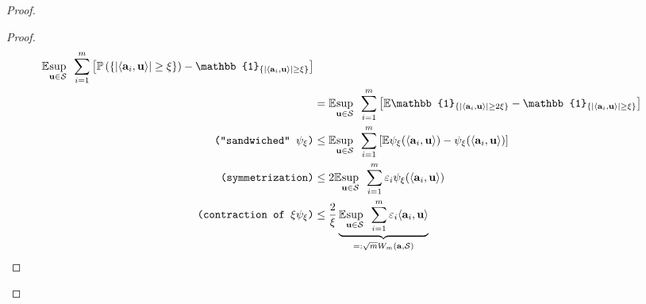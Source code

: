 \begin{proof}
\begin{proof}
{                \begin{align*}
                    \mathbb{E} \underset{\mathbf{u} \in \mathcal{S}}{\sup} \enspace \sum_{i=1}^{m} \left [ \mathbb{P} \left ( \left \{ \left | \langle \mathbf{a}_i, \mathbf{u} \rangle \right | \geq \xi \right \}\right ) - \mathbb{1}_{\{ \left | \langle \mathbf{a}_i, \mathbf{u} \rangle \right | \geq \xi \}} \right ] \\
                    & = \mathbb{E} \underset{\mathbf{u} \in \mathcal{S}}{\sup} \enspace \sum_{i=1}^{m} \left [ \mathbb{E} \mathbb{1}_{\{ \left | \langle \mathbf{a}_i, \mathbf{u} \rangle \right | \geq 2\xi \}} - \mathbb{1}_{\{ \left | \langle \mathbf{a}_i, \mathbf{u} \rangle \right | \geq \xi \}} \right ] \\
                    \comment{``sandwiched'' $\psi_{\xi}$} & \leq \mathbb{E} \underset{\mathbf{u} \in \mathcal{S}}{\sup} \enspace \sum_{i=1}^{m} \left [ \mathbb{E} \psi_{\xi}(\langle \mathbf{a}_i, \mathbf{u} \rangle) - \psi_{\xi}(\langle \mathbf{a}_i, \mathbf{u} \rangle) \right ] \\
                    \comment{symmetrization} & \leq 2 \mathbb{E} \underset{\mathbf{u} \in \mathcal{S}}{\sup} \enspace \sum_{i=1}^{m} \varepsilon_i \psi_{\xi}(\langle \mathbf{a}_i, \mathbf{u} \rangle) \\
                    \comment{contraction of $\xi \psi_{\xi}$} & \leq \frac{2}{\xi} \underbrace{\mathbb{E} \underset{\mathbf{u} \in \mathcal{S}}{\sup} \enspace \sum_{i=1}^{m} \varepsilon_i \langle \mathbf{a}_i, \mathbf{u} \rangle}_{=: \sqrt{m} W_{m}(\mathbf{a}, \mathcal{S})} \\
                \end{align*}
            }
            \qedsymbol
        \end{proof}
\end{proof}